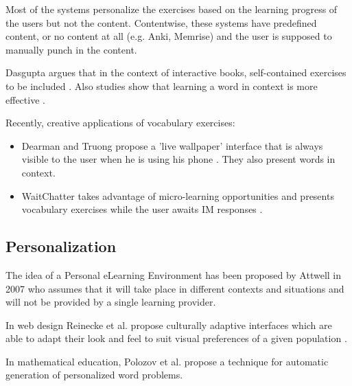 Most of the systems personalize the exercises based on the learning progress of the users but not the content. Contentwise, these systems have predefined content, or no content at all (e.g. Anki, Memrise) and the user is supposed to manually punch in the content. 

Dasgupta argues that in the context of interactive books, self-contained exercises to be included \cite{Dasgupta10-Play}. Also studies show that learning a word in context is more effective \cite{nagy95-context}.






Recently, creative applications of vocabulary exercises:

\begin{itemize}

	\item Dearman and Truong propose a 'live wallpaper' interface that is always visible to the user when he is using his phone \cite{Dear12-ImplicitAcquisition}. They also present words in context. 

	\item WaitChatter takes advantage of micro-learning opportunities and presents vocabulary exercises while the user awaits IM responses \cite{Cai15-wait}.

\end{itemize}




\subsection{Personalization}

The idea of a Personal eLearning Environment has been proposed by Attwell in 2007 \cite{Atwell07-personal} who assumes that it will take place in different contexts and situations and will not be provided by a single learning provider.

In web design Reinecke et al. propose culturally adaptive interfaces which are able to adapt their look and feel to suit visual preferences of a given population \cite{Reinecke13-CulturalAdaptation}. 

In mathematical education, Polozov et al. propose a technique for automatic generation of personalized word problems\cite{Polozov15-AdaptableMath}.









